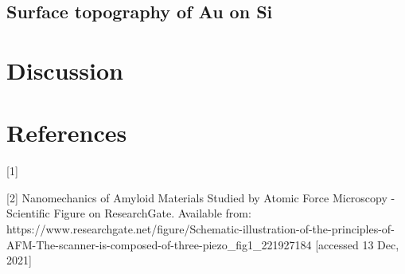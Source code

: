 \documentclass{article}
\begin{document}
\subsection{Surface topography of Au on Si}

\section{Discussion}


\section*{References}

[1] 

[2] Nanomechanics of Amyloid Materials Studied by Atomic Force Microscopy - Scientific Figure on ResearchGate. Available from: https://www.researchgate.net/figure/Schematic-illustration-of-the-principles-of-AFM-The-scanner-is-composed-of-three-piezo_fig1_221927184 [accessed 13 Dec, 2021]
\end{document}
